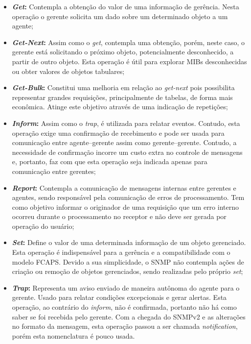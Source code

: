 \documentclass[twoside,english,brazilian]{UNISINOSmonografia}
\begin{document}
\begin{itemize}

\item \textbf{\textit{Get}:}
Contempla a obtenção do valor de uma informação de gerência. Nesta operação o 
gerente solicita um dado sobre um determinado objeto a um agente;

\item \textbf{\textit{Get-Next}:}
Assim como o \textit{get}, contempla uma obtenção, porém, neste caso, o 
gerente está solicitando o próximo objeto, potencialmente desconhecido, a 
partir de outro objeto. 
Esta operação é útil para explorar MIBs desconhecidas ou obter valores 
de objetos tabulares;

\item \textbf{\textit{Get-Bulk}:}
Constitui uma melhoria em relação ao \textit{get-next} pois possibilita 
representar grandes requisições, principalmente de tabelas, de forma mais 
econômica.
Atinge este objetivo através de uma indicação de repetições;

\item \textbf{\textit{Inform}:}
Assim como o \textit{trap}, é utilizada para relatar eventos.
Contudo, esta operação exige uma confirmação de recebimento e pode ser usada 
para comunicação entre agente--gerente assim como gerente--gerente.
Contudo, a necessidade de confirmação incorre um custo extra no controle de 
mensagens e, portanto, faz com que esta operação seja indicada apenas para 
comunicação entre gerentes;

\item \textbf{\textit{Report}:}
Contempla a comunicação de mensagens internas entre gerentes e agentes, 
sendo responsável pela comunicação de erros de processamento.
Tem como objetivo informar o originador de uma requisição que um erro interno 
ocorreu durante o processamento no receptor e não deve ser gerada por operação 
do usuário;

\item \textbf{\textit{Set}:}
Define o valor de uma determinada informação de um objeto gerenciado. 
Esta operação é indispensável para a gerência e a compatibilidade com o 
modelo FCAPS. 
Devido a sua simplicidade, o SNMP não contempla ações de criação ou remoção de 
objetos gerenciados, sendo realizadas pelo próprio \textit{set};

\item \textbf{\textit{Trap}:}
Representa um aviso enviado de maneira autônoma do agente para o gerente. 
Usado para relatar condições excepcionais e gerar alertas.
Esta operação, ao contrário do \textit{inform}, não é confirmada, portanto
não há como saber se foi recebida pelo gerente.
Com a chegada do SNMPv2 e as alterações no formato da mensagem, 
esta operação passou a ser chamada \textit{notification}, 
porém esta nomenclatura é pouco usada.

\end{itemize}
\end{document}
